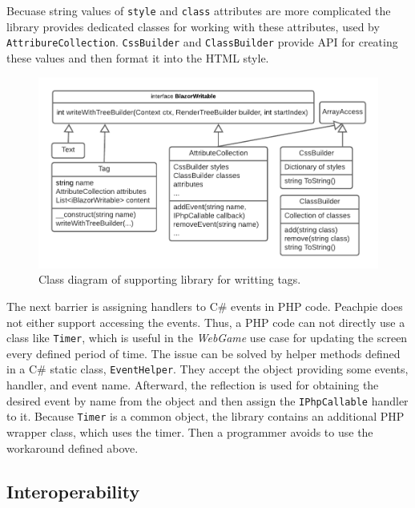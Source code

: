 Becuase string values of \texttt{style} and \texttt{class} attributes are more complicated the library provides dedicated classes for working with these attributes, used by \texttt{AttribureCollection}.
\texttt{CssBuilder} and \texttt{ClassBuilder} provide API for creating these values and then format it into the HTML style.
\par
\begin{figure}\centering
\includegraphics[scale=0.8]{./img/ComponentLibrary}
\caption{Class diagram of supporting library for writting tags.}
\label{img16:diagram}
\end{figure} 
\par
The next barrier is assigning handlers to C\# events in PHP code.
Peachpie does not either support accessing the events.
Thus, a PHP code can not directly use a class like \texttt{Timer}, which is useful in the \textit{WebGame} use case for updating the screen every defined period of time.
The issue can be solved by helper methods defined in a C\# static class, \texttt{EventHelper}.
They accept the object providing some events, handler, and event name.
Afterward, the reflection is used for obtaining the desired event by name from the object and then assign the \texttt{IPhpCallable} handler to it.
Because \texttt{Timer} is a common object, the library contains an additional PHP wrapper class, which uses the timer.
Then a programmer avoids to use the workaround defined above.

\subsection{Interoperability}

